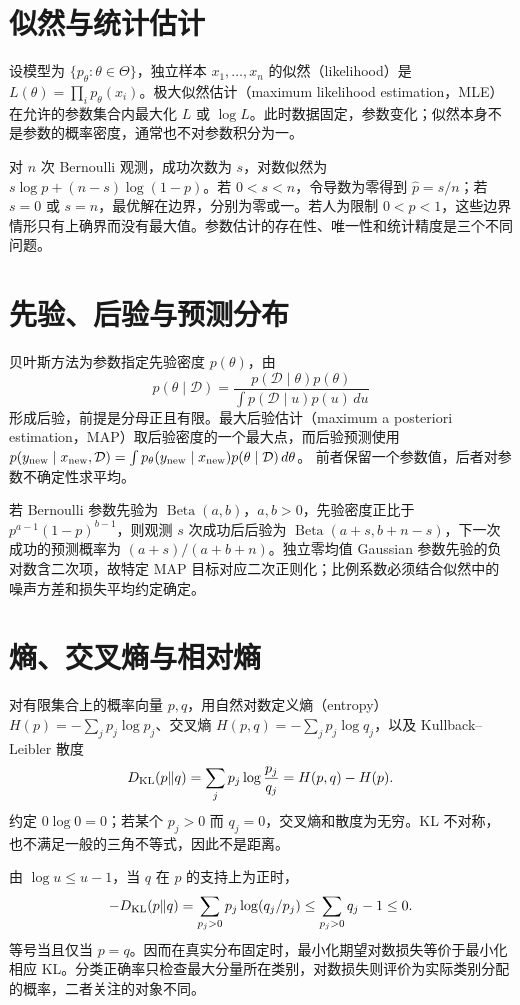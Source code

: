 \section{似然与统计估计}

设模型为 $\{p_\theta:\theta\in\Theta\}$，独立样本 $x_1,\ldots,x_n$ 的似然（likelihood）是 $L(\theta)=\prod_i p_\theta(x_i)$。极大似然估计（maximum likelihood estimation，MLE）在允许的参数集合内最大化 $L$ 或 $\log L$。此时数据固定，参数变化；似然本身不是参数的概率密度，通常也不对参数积分为一。

对 $n$ 次 Bernoulli 观测，成功次数为 $s$，对数似然为 $s\log p+(n-s)\log(1-p)$。若 $0<s<n$，令导数为零得到 $\widehat p=s/n$；若 $s=0$ 或 $s=n$，最优解在边界，分别为零或一。若人为限制 $0<p<1$，这些边界情形只有上确界而没有最大值。参数估计的存在性、唯一性和统计精度是三个不同问题。

\section{先验、后验与预测分布}

贝叶斯方法为参数指定先验密度 $p(\theta)$，由
\[
 p(\theta\mid\mathcal D)=\frac{p(\mathcal D\mid\theta)p(\theta)}
 {\int p(\mathcal D\mid u)p(u)\,du}
\]
形成后验，前提是分母正且有限。最大后验估计（maximum a posteriori estimation，MAP）取后验密度的一个最大点，而后验预测使用
$p(y_{\rm new}\mid x_{\rm new},\mathcal D)=\int p_\theta(y_{\rm new}\mid x_{\rm new})p(\theta\mid\mathcal D)\,d\theta$。
前者保留一个参数值，后者对参数不确定性求平均。

若 Bernoulli 参数先验为 $\operatorname{Beta}(a,b)$，$a,b>0$，先验密度正比于 $p^{a-1}(1-p)^{b-1}$，则观测 $s$ 次成功后后验为 $\operatorname{Beta}(a+s,b+n-s)$，下一次成功的预测概率为 $(a+s)/(a+b+n)$。独立零均值 Gaussian 参数先验的负对数含二次项，故特定 MAP 目标对应二次正则化；比例系数必须结合似然中的噪声方差和损失平均约定确定。

\section{熵、交叉熵与相对熵}

对有限集合上的概率向量 $p,q$，用自然对数定义熵（entropy）$H(p)=-\sum_jp_j\log p_j$、交叉熵 $H(p,q)=-\sum_jp_j\log q_j$，以及 Kullback--Leibler 散度
\[
 D_{\rm KL}(p\Vert q)=\sum_jp_j\log\frac{p_j}{q_j}
 =H(p,q)-H(p).
\]
约定 $0\log0=0$；若某个 $p_j>0$ 而 $q_j=0$，交叉熵和散度为无穷。KL 不对称，也不满足一般的三角不等式，因此不是距离。

由 $\log u\leq u-1$，当 $q$ 在 $p$ 的支持上为正时，
\[
 -D_{\rm KL}(p\Vert q)=\sum_{p_j>0}p_j\log(q_j/p_j)
 \leq\sum_{p_j>0}q_j-1\leq0.
\]
等号当且仅当 $p=q$。因而在真实分布固定时，最小化期望对数损失等价于最小化相应 KL。分类正确率只检查最大分量所在类别，对数损失则评价为实际类别分配的概率，二者关注的对象不同。

